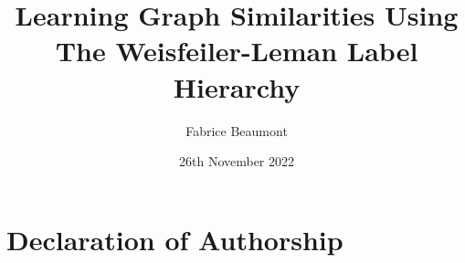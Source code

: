 
\usepackage[
	backend=biber,
	sortlocale=en_US,
	natbib=true,
	url=false, 
	doi=true,
	eprint=false,
	citestyle=ieee %
]{biblatex} %


\author{Fabrice Beaumont}
\date{26th November 2022}

\title{Learning Graph Similarities Using The Weisfeiler-Leman Label Hierarchy}




\maketitle
\tableofcontents
\newpage








\newpage
%
%
\printbibliography

\newpage
\section*{Declaration of Authorship}

